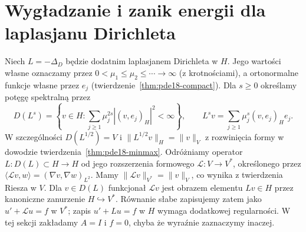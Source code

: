 \section{Wygładzanie i zanik energii dla laplasjanu Dirichleta}
Niech $L=-\Delta_D$ będzie dodatnim laplasjanem Dirichleta
w $H$. Jego wartości własne oznaczamy przez
$0<\mu_1\le\mu_2\le\cdots\to\infty$ (z krotnościami),
a ortonormalne funkcje własne przez $e_j$
(twierdzenie~\ref{thm:pde18-compact}).
Dla $s\ge0$ określamy potęgę spektralną przez
\[
 D(L^s)=\left\{v\in H:\sum_{j\ge1}\mu_j^{2s}|(v,e_j)_H|^2<\infty\right\},
 \qquad L^sv=\sum_{j\ge1}\mu_j^s(v,e_j)_He_j.
\]
W szczególności $D(L^{1/2})=V$ i
$\|L^{1/2}v\|_H=\|v\|_V$ z rozwinięcia formy
w dowodzie twierdzenia~\ref{thm:pde18-minmax}.
Odróżniamy operator $L:D(L)\subset H\to H$
od jego rozszerzenia formowego $\mathcal L:V\to V^*$,
określonego przez
$\langle\mathcal Lv,w\rangle=(\nabla v,\nabla w)_{L^2}$.
Mamy $\|\mathcal Lv\|_{V^*}=\|v\|_V$, co wynika
z twierdzenia Riesza w $V$. Dla $v\in D(L)$
funkcjonał $\mathcal Lv$ jest obrazem elementu $Lv\in H$
przez kanoniczne zanurzenie $H\hookrightarrow V^*$.
Równanie słabe zapisujemy zatem jako
$u'+\mathcal Lu=f$ w $V^*$; zapis $u'+Lu=f$ w $H$
wymaga dodatkowej regularności.
W tej sekcji zakładamy
$A=I$ i $f=0$, chyba że wyraźnie zaznaczymy inaczej.

